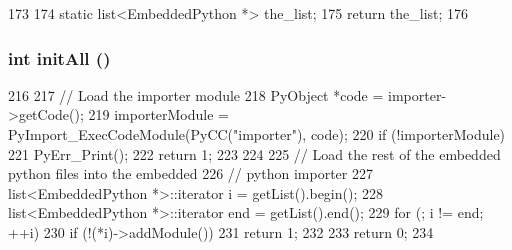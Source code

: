 \begin{DoxyCode}
173 {
174     static list<EmbeddedPython *> the_list;
175     return the_list;
176 }
\end{DoxyCode}
\hypertarget{structEmbeddedPython_a545809966798dc7f72af9335fd61da31}{
\subsubsection[{initAll}]{\setlength{\rightskip}{0pt plus 5cm}int initAll ()}}
\label{structEmbeddedPython_a545809966798dc7f72af9335fd61da31}



\begin{DoxyCode}
216 {
217     // Load the importer module
218     PyObject *code = importer->getCode();
219     importerModule = PyImport_ExecCodeModule(PyCC("importer"), code);
220     if (!importerModule) {
221         PyErr_Print();
222         return 1;
223     }
224 
225     // Load the rest of the embedded python files into the embedded
226     // python importer
227     list<EmbeddedPython *>::iterator i = getList().begin();
228     list<EmbeddedPython *>::iterator end = getList().end();
229     for (; i != end; ++i)
230         if (!(*i)->addModule())
231             return 1;
232 
233     return 0;
234 }
\end{DoxyCode}


